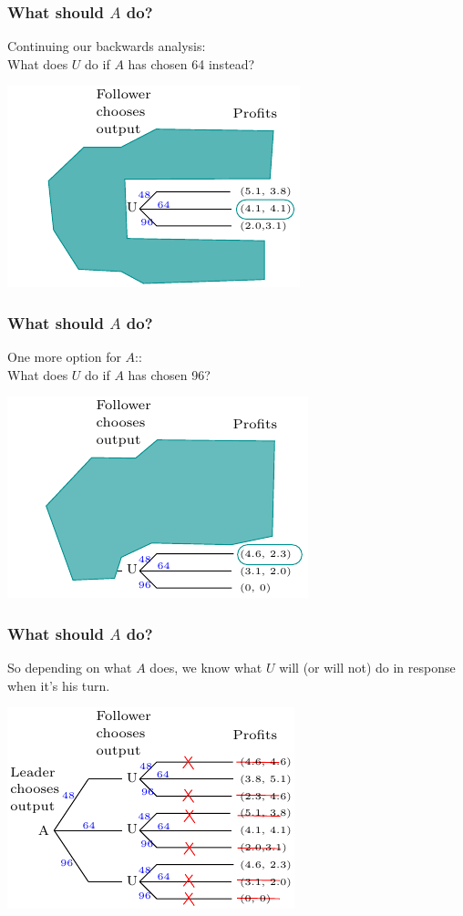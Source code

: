 \documentclass[xcolor=pdftex,dvipsnames]{beamer}
\begin{document}
\begin{frame}
  \frametitle{What should $A$ do?}
Continuing our backwards analysis:\\
What does $U$ do if $A$ has chosen 64 instead?

  \begin{center}
    \includegraphics{pics/Stackelberg2}
  \end{center}

\end{frame}

\begin{frame}
  \frametitle{What should $A$ do?}
One more option for $A$::\\
What does $U$ do if $A$ has chosen 96?

  \begin{center}
    \includegraphics{pics/Stackelberg3}
  \end{center}

\end{frame}

\begin{frame}
  \frametitle{What should $A$ do?}
So depending on what $A$ does, we know what $U$ will (or will not) do
in response when it's his turn.

  \begin{center}
    \includegraphics{pics/Stackelberg4}
  \end{center}

\end{frame}
\end{document}
